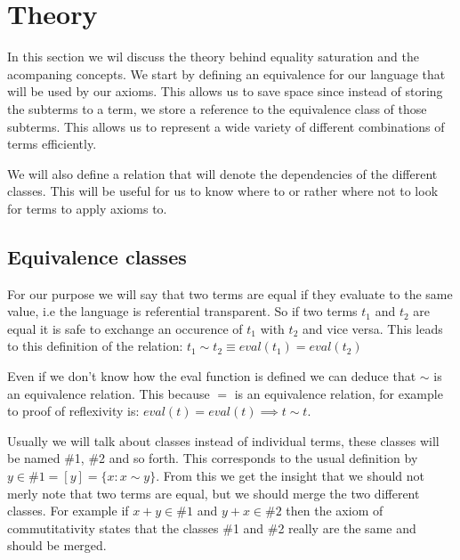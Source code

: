 



\section{Theory}

In this section we wil discuss the theory behind equality saturation and the acompaning concepts. We
start by defining an equivalence for our language that will be used by our axioms.
This allows us to save space since instead of storing the subterms to a term, we
store a reference to the equivalence class of those subterms. This allows us to represent a wide 
variety of different combinations of terms efficiently.

We will also define a relation
that will denote the dependencies of the different classes. This will be useful for us to know where to
or rather where not to look for terms to apply axioms to.
\subsection{Equivalence classes}


For our purpose we will say that two terms are equal if they evaluate to the same value, i.e the language
is referential transparent. So if two terms $t_1$ and $t_2$ are equal it is safe to exchange an occurence
of $t_1$ with $t_2$ and vice versa. This leads to this definition of the relation:
$t_1 \sim t_2 \equiv eval(t_1) = eval(t_2)$


Even if we don't know how the eval function is defined we can deduce that $\sim$ is an equivalence relation.
This because $=$ is an equivalence relation, for example to proof of reflexivity is:
$eval(t) = eval(t) \implies t \sim t$.


Usually we will talk about classes instead of individual terms, these classes will
be named \#1, \#2 and so forth. This corresponds to the usual definition by
$y \in \#1 = [y] = \{ x : x \sim y\}$. From this we get the insight that we should
not merly note that two terms are equal, but we should merge the two different classes.
For example if $x + y \in \#1$ and $y + x \in \#2$ then the axiom of commutitativity
states that the classes \#1 and \#2 really are the same and should be merged.





